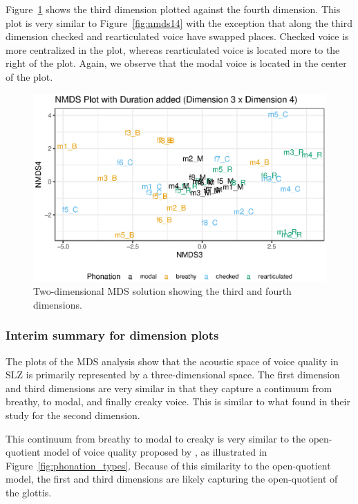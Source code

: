 Figure~\ref{fig:nmds34} shows the third dimension plotted against the fourth dimension. This plot is very similar to Figure~\ref{fig:nmds14} with the exception that along the third dimension checked and rearticulated voice have swapped places. Checked voice is more centralized in the plot, whereas rearticulated voice is located more to the right of the plot. Again, we observe that the modal voice is located in the center of the plot.

\begin{figure}[h!]
    \centering
    \includegraphics[width = 0.9\linewidth]{images/MDS/nmds34_dur.eps}
    \caption{Two-dimensional MDS solution showing the third and fourth dimensions.}
    \label{fig:nmds34}
\end{figure}

\subsubsection{Interim summary for dimension plots} \label{sec:acousticlandscape:inter_sum}

The plots of the MDS analysis show that the acoustic space of voice quality in SLZ is primarily represented by a three-dimensional space. The first dimension and third dimensions are very similar in that they capture a continuum from breathy, to modal, and finally creaky voice. This is similar to what \citet{keatingCrosslanguageAcousticSpace2023} found in their study for the second dimension. 

This continuum from breathy to modal to creaky is very similar to the open-quotient model of voice quality proposed by \citet{gordonPhonationTypesCrosslinguistic2001}, as illustrated in Figure~\ref{fig:phonation_types}. Because of this similarity to the open-quotient model, the first and third dimensions are likely capturing the open-quotient of the glottis. 

